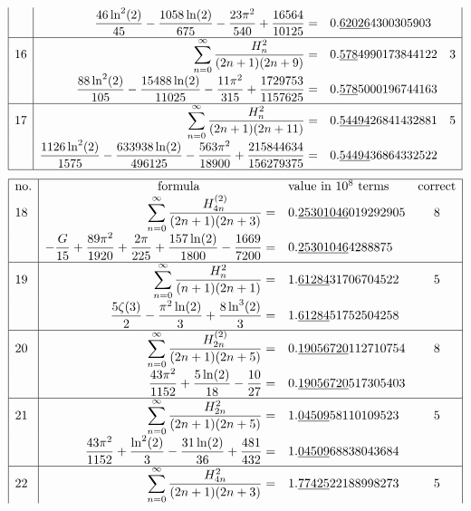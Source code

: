 \documentclass[12pt]{book}
\begin{document}
\begin{CJK}{UTF8}{bsmi}
$$\begin{array}{|l|rlc|}
 & \displaystyle \frac{46\ln^2(2)}{45}-\frac{1058\ln(2)}{675}-\frac{23\pi^2}{540}+\frac{16564}{10125}= &
0.\underline{62026}4300305903 & \\[5pt]
\hline
16 & \displaystyle \sum_{n=0}^\infty\frac{H_{n}^{2}}{(2n+1)(2n+9)}= &
0.\underline{578}4990173844122 & 3 \\
 & \displaystyle \frac{88\ln^2(2)}{105}-\frac{15488\ln(2)}{11025}-\frac{11\pi^2}{315}+\frac{1729753}{1157625}=  &
0.\underline{578}5000196744163 & \\[5pt]
\hline
17 & \displaystyle \sum_{n=0}^\infty\frac{H_{n}^{2}}{(2n+1)(2n+11)}= &
0.\underline{54494}26841432881 & 5 \\
 & \displaystyle \frac{1126\ln^2(2)}{1575}-\frac{633938\ln(2)}{496125}-\frac{563\pi^2}{18900}+\frac{215844634}{156279375}= &
0.\underline{54494}36864332522 & \\[5pt]
\hline
\end{array}$$
$$\begin{array}{|l|rlc|}
\hline
\text{no.} & 
\text{formula\qquad\qquad\qquad} & 
\text{value in }10^8 \text{ terms} & 
\text{correct} \\
18 & \displaystyle \sum_{n=0}^\infty\frac{H_{4n}^{(2)}}{(2n+1)(2n+3)}= &
0.\underline{25301046}019292905 & 8 \\
 & \displaystyle -\frac{G}{15}+\frac{89\pi^2}{1920}+\frac{2\pi}{225}+\frac{157\ln(2)}{1800}-\frac{1669}{7200}= &
0.\underline{25301046}4288875 & \\[5pt]
\hline
19 & \displaystyle \sum_{n=0}^\infty\frac{H_{n}^{2}}{(n+1)(2n+1)}= &
1.\underline{61284}31706704522 & 5 \\
 & \displaystyle \frac{5\zeta(3)}{2}-\frac{\pi^2\ln(2)}{3}+\frac{8\ln^3(2)}{3}= &
1.\underline{61284}51752504258 & \\[5pt]
\hline
20 & \displaystyle \sum_{n=0}^\infty\frac{H_{2n}^{(2)}}{(2n+1)(2n+5)}= &
0.\underline{19056720}112710754 & 8 \\
 & \displaystyle \frac{43\pi^2}{1152}+\frac{5\ln(2)}{18}-\frac{10}{27}= &
0.\underline{19056720}517305403 & \\[5pt]
\hline
21 & \displaystyle \sum_{n=0}^\infty\frac{H_{2n}^{2}}{(2n+1)(2n+5)}= &
1.\underline{04509}58110109523 & 5 \\
 & \displaystyle \frac{43\pi^2}{1152}+\frac{\ln^2(2)}{3}-\frac{31\ln(2)}{36}+\frac{481}{432}= &
1.\underline{04509}68838043684 & \\[5pt]
\hline
22 & \displaystyle \sum_{n=0}^\infty\frac{H_{4n}^{2}}{(2n+1)(2n+3)}= &
1.\underline{77425}22188998273 & 5 \\

\end{array}$$
\end{CJK}
\end{document}
